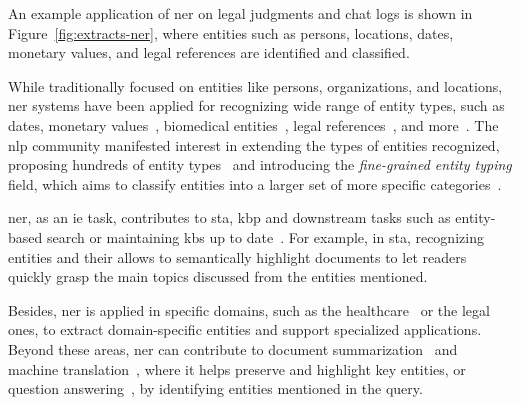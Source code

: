 An example application of \ac{ner} on legal judgments and chat logs is shown in Figure~\ref{fig:extracts-ner}, where entities such as persons, locations, dates, monetary values, and legal references are identified and classified.


While traditionally focused on entities like persons, organizations, and locations, \ac{ner} systems have been applied for recognizing wide range of entity types, such as dates, monetary values~\cite{muc6_overview_1995}, biomedical entities~\cite{hanisch2005prominer,archana2023effective,aioner_bioner_2023}, legal references~\cite{chalkidis_extracting_contracts_2017,cardellino_etal_2017_lowcost,ccetindaug2023name_legal_turkish}, and more~\cite{entityorientedsearch2018balog}. The \ac{nlp} community manifested interest in extending the types of entities recognized, proposing hundreds of entity types~\cite{sekine2002extended_150ner_types,sekine2004definition_200ner_types,yosef-etal-2012-hyena} and introducing the \emph{fine-grained entity typing} field, which aims to classify entities into a larger set of more specific categories~\cite{fget_review_2023}.

\ac{ner}, as an \acl{ie} task, contributes to \acl{sta}, \acl{kbp} and downstream tasks such as entity-based search or maintaining \acp{kb} up to date~\cite{entityorientedsearch2018balog}. For example, in \ac{sta}, recognizing entities and their allows to semantically highlight documents to let readers quickly grasp the main topics discussed from the entities mentioned. 

Besides, \ac{ner} is applied in specific domains, such as the healthcare~\cite{hanisch2005prominer,archana2023effective,aioner_bioner_2023} or the legal~\cite{chalkidis_extracting_contracts_2017,cardellino_etal_2017_lowcost,ccetindaug2023name_legal_turkish} ones, to extract domain-specific entities and support specialized applications.
Beyond these areas, \ac{ner} can contribute to document summarization~\cite{khademi2020persian,lin-zeldes-2024-gumsley,roha_ner_summarizaton_2023} and machine translation~\cite{xie2022end,hkiri-etal-2017-arabic}, where it helps preserve and highlight key entities, or question answering~\cite{molla2006named,ner_qa_review_2016}, by identifying entities mentioned in the query.

